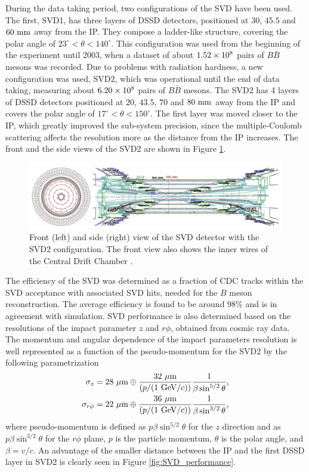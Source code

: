 During the data taking period, two configurations of the SVD have been used. The first, SVD1, has three layers of DSSD detectors, positioned at $30$, $45.5$ and $60\mathrm{~mm}$ away from the IP. They compose a ladder-like structure, covering the polar angle of $23^\circ < \theta < 140^\circ$. This configuration was used from the beginning of the experiment until 2003, when a dataset of about $1.52\times 10^{8}$ pairs of $B \bar B$ mesons was recorded. Due to problems with radiation hardness, a new configuration was used, SVD2, which was operational until the end of data taking, measuring about $6.20\times 10^{8}$ pairs of $B \bar B$ mesons. The SVD2 has 4 layers of DSSD detectors positioned at $20$, $43.5$, $70$ and $80\mathrm{~mm}$ away from the IP and covers the polar angle of $17^\circ < \theta < 150^\circ$. The first layer was moved closer to the IP, which greatly improved the sub-system precision, since the multiple-Coulomb scattering affects the resolution more as the distance from the IP increases. The front and the side views of the SVD2 are shown in Figure \ref{fig:SVD_layout}.

\begin{figure}[H]
	\centering
	\captionsetup{width=0.8\linewidth}
	\includegraphics[width=\linewidth]{fig/setup/SVD_layout}
	\caption{Front (left) and side (right) view of the SVD detector with the SVD2 configuration. The front view also shows the inner wires of the Central Drift Chamber \cite{haba2004letter}.}
	\label{fig:SVD_layout}
\end{figure}

The efficiency of the SVD was determined as a fraction of CDC tracks within the SVD acceptance with associated SVD hits, needed for the $B$ meson reconstruction. The average efficiency is found to be around $98\%$ and is in agreement with simulation. SVD performance is also determined based on the resolutions of the impact parameter $z$ and $r\phi$, obtained from cosmic ray data. The momentum and angular dependence of the impact parameters resolution is well represented as a function of the pseudo-momentum for the SVD2 by the following parametrization
\begin{align}
\sigma_z = 28\mathrm{~\mu m}\oplus \frac{32\mathrm{~\mu m}}{\left(p/(1\mathrm{~GeV}/c)\right)}\frac{1}{\beta \sin^{5/2}\theta},\\
\sigma_{r\phi} = 22\mathrm{~\mu m}\oplus \frac{36\mathrm{~\mu m}}{\left(p/(1\mathrm{~GeV}/c)\right)}\frac{1}{\beta \sin^{3/2}\theta},
\end{align}
where pseudo-momentum is defined as $p\beta \sin^{5/2}\theta$ for the $z$ direction and as $p\beta \sin^{3/2}\theta$ for the $r\phi$ plane, $p$ is the particle momentum, $\theta$ is the polar angle, and $\beta=v/c$. An advantage of the smaller distance between the IP and the first DSSD layer in SVD2 is clearly seen in Figure \ref{fig:SVD_performance}.


